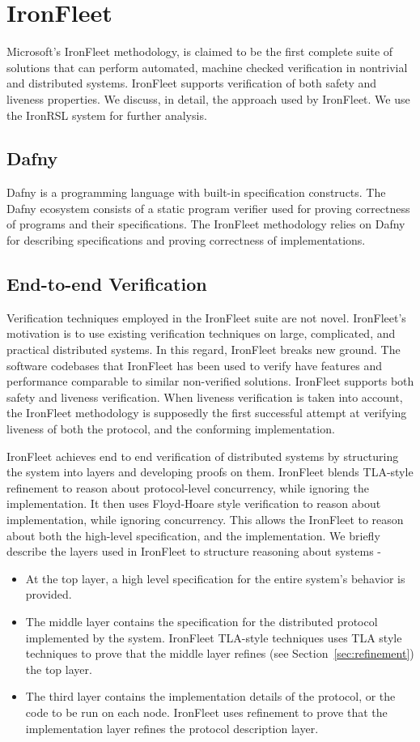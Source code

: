 \documentclass{llncs}
\begin{document}
\section{IronFleet}
Microsoft's IronFleet methodology, is claimed to be the first complete suite of 
solutions that can perform automated, machine checked verification 
in nontrivial and distributed systems. IronFleet supports 
verification of both safety and liveness properties. We discuss, in detail, the 
approach used by IronFleet. We use the IronRSL system for further analysis.

\subsection{Dafny}
Dafny is a programming language with built-in specification constructs. The Dafny
ecosystem consists of a static program verifier used for proving correctness of
programs and their specifications. The IronFleet methodology relies 
on Dafny for describing specifications and proving correctness of implementations. 

\subsection{End-to-end Verification}
Verification techniques employed in the IronFleet suite are not novel. IronFleet's 
motivation is to use existing verification techniques on large, complicated, and practical distributed
systems. In this regard, IronFleet breaks new ground. The software codebases that IronFleet
has been used to verify have features and performance comparable to similar non-verified solutions. 
IronFleet supports both safety and liveness verification. When liveness verification is taken into account, 
the IronFleet methodology is supposedly the first successful attempt at verifying liveness of both
the protocol, and the conforming implementation. 

IronFleet achieves end to end verification of distributed systems by structuring the system into layers and 
developing proofs on them. IronFleet blends TLA-style refinement to reason about protocol-level concurrency, 
while ignoring the implementation. It then uses Floyd-Hoare style verification to reason about implementation,
while ignoring concurrency. This allows the IronFleet to reason about both the high-level specification, and
the implementation. We briefly describe the layers used in IronFleet to structure reasoning about systems - 
\begin{itemize}
\item At the top layer, a high level specification for the entire system's behavior is provided. 
\item The middle layer contains the specification for the distributed protocol implemented by the
    system. IronFleet TLA-style techniques uses TLA style techniques to prove that the middle layer 
    refines (see Section~\ref{sec:refinement}) the top layer.
\item The third layer contains the implementation details of the protocol, or the code to be run on each node.
    IronFleet uses refinement to prove that the implementation layer refines the protocol description layer. 
\end{itemize}
\end{document}
